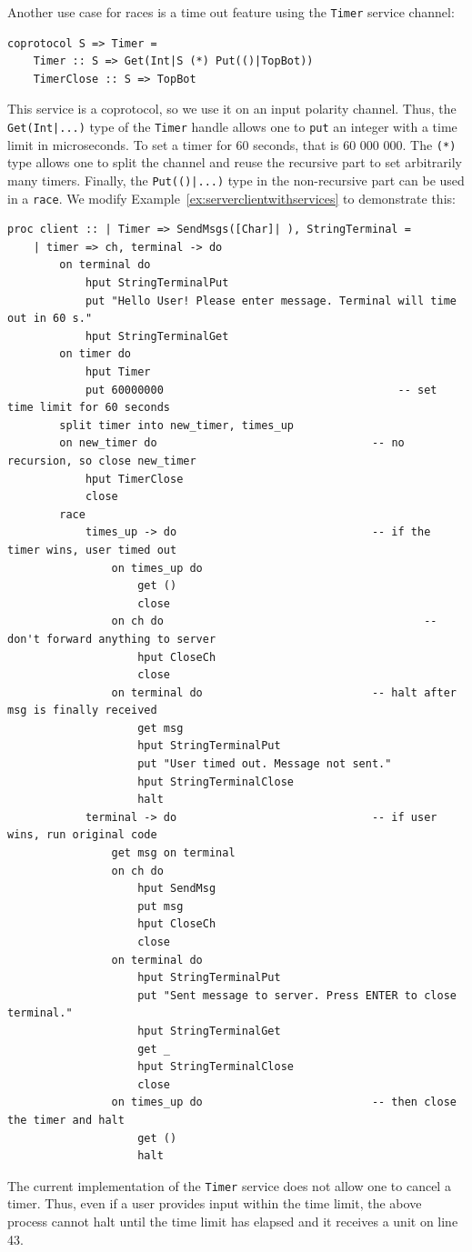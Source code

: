 \documentclass[acmsmall]{acmart}
\begin{document}
Another use case for races is a time out feature using the \lstinline{Timer} service channel:
\begin{lstlisting}
coprotocol S => Timer =
    Timer :: S => Get(Int|S (*) Put(()|TopBot))
    TimerClose :: S => TopBot 
\end{lstlisting}
This service is a coprotocol, so we use it on an input polarity channel.
Thus, the \lstinline{Get(Int|...)} type of the \lstinline{Timer} handle allows one to \lstinline{put} an integer with a time limit in microseconds.
To set a timer for 60 seconds, that is 60 000 000.
The \lstinline{(*)} type allows one to split the channel and reuse the recursive part to set arbitrarily many timers.
Finally, the \lstinline{Put(()|...)} type in the non-recursive part can be used in a \lstinline{race}.
We modify Example~\ref{ex:serverclientwithservices} to demonstrate this:
\begin{lstlisting}[label=ex:clienttimeout, caption=Client that times out the Terminal after 60 seconds.]
proc client :: | Timer => SendMsgs([Char]| ), StringTerminal =
	| timer => ch, terminal -> do
		on terminal do
			hput StringTerminalPut
			put "Hello User! Please enter message. Terminal will time out in 60 s."
			hput StringTerminalGet
		on timer do
			hput Timer
			put 60000000									-- set time limit for 60 seconds
		split timer into new_timer, times_up
		on new_timer do									-- no recursion, so close new_timer
			hput TimerClose
			close
		race
			times_up -> do								-- if the timer wins, user timed out
				on times_up do
					get ()
					close
				on ch do										-- don't forward anything to server
					hput CloseCh
					close
				on terminal do							-- halt after msg is finally received
					get msg
					hput StringTerminalPut
					put "User timed out. Message not sent."
					hput StringTerminalClose
					halt
			terminal -> do								-- if user wins, run original code
				get msg on terminal
				on ch do
					hput SendMsg
					put msg
					hput CloseCh
					close
				on terminal do
					hput StringTerminalPut
					put "Sent message to server. Press ENTER to close terminal."
					hput StringTerminalGet
					get _
					hput StringTerminalClose
					close
				on times_up do							-- then close the timer and halt
					get ()
					halt
\end{lstlisting}
The current implementation of the \lstinline{Timer} service does not allow one to cancel a timer.
Thus, even if a user provides input within the time limit, the above process cannot halt until the time limit has elapsed and it receives a unit on line 43.
\end{document}
